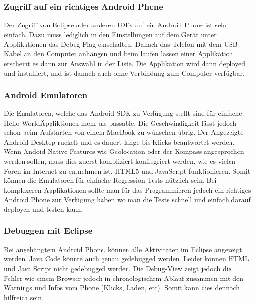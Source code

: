 \subsubsection{Zugriff auf ein richtiges Android Phone} %
\label{ssub:Zugriff auf ein richtiges Android Phone}
Der Zugriff von Eclipse oder anderen IDEs auf ein Android Phone ist sehr einfach. Dazu muss lediglich in den Einstellungen auf dem Gerät unter Applikationen das Debug-Flag einschalten. Danach das Telefon mit dem USB Kabel an den Computer anhängen und beim laufen lassen einer Applikation erscheint es dann zur Auswahl in der Liste. Die Applikation wird dann deployed und installiert, und ist danach auch ohne Verbindung zum Computer verfügbar.

\subsubsection{Android Emulatoren} %
\label{ssub:Android Emulatoren}
Die Emulatoren, welche das Android SDK zu Verfügung stellt sind für einfache \"Hello World\" Appliktionen mehr als passable. Die Geschwindigkeit lässt jedoch schon beim Aufstarten von einem MacBook zu wünschen übrig. Der Angezeigte Android Desktop ruckelt und es dauert lange bis Klicks beantwortet werden. Wenn Andoid Native Features wie Geolocation oder der Kompass angesprochen werden sollen, muss dies zuerst kompliziert konfiugriert werden, wie es vielen Foren im Internet zu entnehmen ist. HTML5 und JavaScript funktionieren. Somit können die Emulatoren für einfache Regression Tests nützlich sein. Bei komplexeren Applikationen sollte man für das Programmieren jedoch ein richtiges Android Phone zur Verfügung haben wo man die Tests schnell und einfach darauf deployen und testen kann.

\subsubsection{Debuggen mit Eclipse} %
\label{ssub:Debuggen mit Eclipse}
Bei angehängtem Android Phone, können alle Aktivitäten im Eclipse angezeigt werden. Java Code könnte auch genau gedebugged werden. Leider können HTML und Java Script nicht gedebugged werden. Die Debug-View zeigt jedoch die Fehler wie einem Browser jedoch in chronologischem Ablauf zusammen mit den Warnings und Infos vom Phone (Klicks, Laden, etc). Somit kann dies dennoch hilfreich sein. 

